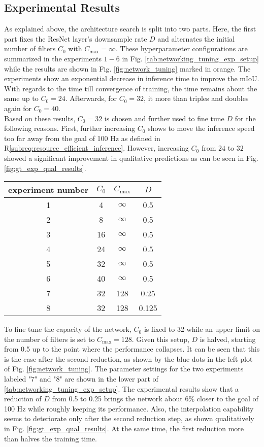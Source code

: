 \subsection{Experimental Results}
\label{subsec:exp_results_unet_arch}
As explained above, the architecture search is split into two parts. Here, the first part fixes the ResNet layer's downsample rate $D$ and alternates the initial number of filters $C_0$ with $C_{\max} = \infty$. These hyperparameter configurations are summarized in the experiments $1-6$ in Fig. \ref{tab:networking_tuning_exp_setup} while the results are shown in Fig. \ref{fig:network_tuning} marked in orange. The experiments show an exponential decrease in inference time to improve the mIoU. With regards to the time till convergence of training, the time remains about the same up to $C_0 = 24$. Afterwards, for $C_0 = 32$, it more than triples and doubles again for $C_0 = 40$.\\
Based on these results, $C_0 = 32$ is chosen and further used to fine tune $D$ for the following reasons. First, further increasing $C_0$ shows to move the inference speed too far away from the goal of 100 Hz as defined in R\ref{subreq:resource_efficient_inference}. However, increasing $C_0$ from $24$ to $32$ showed a significant improvement in qualitative predictions as can be seen in Fig. \ref{fig:gt_exp_qual_results}.
\begin{center}
\begin{tabular}{c|c|c|c}
	experiment number & $C_0$ & $C_{\max}$ & $D$ \\
	\hline
	1 & 4 & $\infty$ & 0.5 \\
	2 & 8 & $\infty$ & 0.5 \\
	3 & 16 & $\infty$ & 0.5 \\
	4 & 24 & $\infty$ & 0.5 \\
	5 & 32 & $\infty$ & 0.5 \\
	6 & 40 & $\infty$ & 0.5 \\
	\hline
	7 & 32 & 128 & 0.25 \\
	8 & 32 & 128 & 0.125
\end{tabular}
\end{center}
To fine tune the capacity of the network, $C_0$ is fixed to 32 while an upper limit on the number of filters is set to $C_{\max}=128$. Given this setup, $D$ is halved, starting from 0.5 up to the point where the performance collapses. It can be seen that this is the case after the second reduction, as shown by the blue dots in the left plot of Fig. \ref{fig:network_tuning}. The parameter settings for the two experiments labeled "7" and "8" are shown in the lower part of \ref{tab:networking_tuning_exp_setup}. The experimental results show that a reduction of $D$ from 0.5 to 0.25 brings the network about $6\%$ closer to the goal of 100 Hz while roughly keeping its performance. Also, the interpolation capability seems to deteriorate only after the second reduction step, as shown qualitatively in Fig. \ref{fig:gt_exp_qual_results}. At the same time, the first reduction more than halves the training time.
